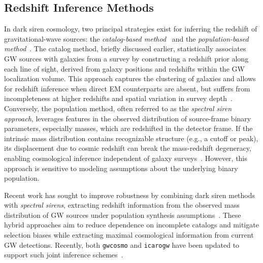 \subsection{Redshift Inference Methods}
In dark siren cosmology, two principal strategies exist for inferring the redshift of gravitational-wave sources: the \textit{catalog-based method}~\citep{gray2020cosmological,gray2023joint,chen2024testing} and the \textit{population-based method}~\citep{ezquiaga2022spectral}. The catalog method, briefly discussed earlier, statistically associates \ac{GW} sources with galaxies from a survey by constructing a redshift prior along each line of sight, derived from galaxy positions and redshifts within the \ac{GW} localization volume. This approach captures the clustering of galaxies and allows for redshift inference when direct \ac{EM} counterparts are absent, but suffers from incompleteness at higher redshifts and spatial variation in survey depth~\citep{gray2020cosmological,gray2023joint,chen2024testing}. Conversely, the population method, often referred to as the \textit{spectral siren approach}, leverages features in the observed distribution of source-frame binary parameters, especially masses, which are redshifted in the detector frame. If the intrinsic mass distribution contains recognizable structure (e.g., a cutoff or peak), its displacement due to cosmic redshift can break the mass-redshift degeneracy, enabling cosmological inference independent of galaxy surveys~\citep{ezquiaga2022spectral}. However, this approach is sensitive to modeling assumptions about the underlying binary population. 

Recent work has sought to improve robustness by combining dark siren methods with \textit{spectral sirens}, extracting redshift information from the observed mass distribution of \ac{GW} sources under population synthesis assumptions~\citep{ezquiaga2022spectral}. These hybrid approaches aim to reduce dependence on incomplete catalogs and mitigate selection biases while extracting maximal cosmological information from current GW detections. Recently, both \texttt{gwcosmo} and \texttt{icarogw} have been updated to support such joint inference schemes~\citep{gray2023joint, mastrogiovanni2024icarogw}.

